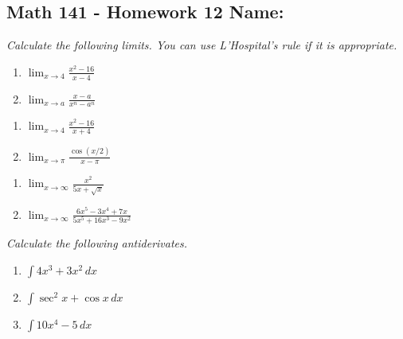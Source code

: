 \documentclass[11pt]{article}
\newcommand{\ds}{\displaystyle}
\begin{document}
\pagestyle{empty}
\subsection*{Math 141 - Homework 12 \hfill Name: \underline{\hspace*{2in}}}


\textit{Calculate the following limits. You can use L'Hospital's rule if it is appropriate.}
\begin{multicols}{2}
\begin{enumerate}
\item $\ds \lim_{x \rightarrow 4} \frac{x^2 - 16}{x-4}$
\item $\ds \lim_{x \rightarrow a} \frac{x-a}{x^n - a^n}$
\setcounter{enumCount}{\theenumi}
\end{enumerate}
\end{multicols}
\vfill

\noindent
\begin{multicols}{2}
\begin{enumerate}
\setcounter{enumi}{\theenumCount}
\item $\ds \lim_{x \rightarrow 4} \frac{x^2 - 16}{x+4}$
\item $\ds \lim_{x \rightarrow \pi} \frac{\cos(x/2)}{x-\pi}$
\setcounter{enumCount}{\theenumi}
\end{enumerate}
\end{multicols}
\vfill

\noindent
\begin{multicols}{2}
\begin{enumerate}
\setcounter{enumi}{\theenumCount}
\item $\ds \lim_{x \rightarrow \infty} \frac{x^2}{5x + \sqrt{x}}$
\item $\ds \lim_{x \rightarrow \infty} \frac{6x^5 - 3x^4 + 7x}{5x^5 + 16x^3 - 9 x^2}$
\setcounter{enumCount}{\theenumi}
\end{enumerate}
\end{multicols}
\vfill


\noindent
\textit{Calculate the following antiderivates.}

\begin{multicols}{3}
\begin{enumerate}
\setcounter{enumi}{\theenumCount}
\item $\ds \int 4x^3 + 3x^2\, dx$
\item $\ds \int \sec^2 x + \cos x\, dx$
\item $\ds \int 10x^4 - 5\, dx$
\setcounter{enumCount}{\theenumi}
\end{enumerate}
\end{multicols}
\vfill
\end{document}
